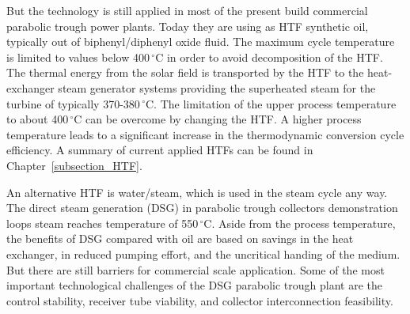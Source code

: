 But the technology is still applied in most of the present build commercial parabolic trough power plants. Today they are using as HTF synthetic oil, typically out of biphenyl/diphenyl oxide fluid. The maximum cycle temperature is limited to values below 400$\,^{\circ}\mathrm{C}$ in order to avoid decomposition of the HTF. The thermal energy from the solar field is transported by the HTF to the heat-exchanger steam generator systems providing the superheated steam for the turbine of typically 370-380$\,^{\circ}\mathrm{C}$. The limitation of the upper process temperature to about 400$\,^{\circ}\mathrm{C}$ can be overcome by changing the HTF. A higher process temperature leads to a significant increase in the thermodynamic conversion cycle efficiency. A summary of current applied HTFs can be found in Chapter~\ref{subsection_HTF}.

An alternative HTF is water/steam, which is used in the steam cycle any way. The direct steam generation (DSG) in parabolic trough collectors demonstration loops steam reaches temperature of 550$\,^{\circ}\mathrm{C}$. Aside from the process temperature, the benefits of DSG compared with oil are based on savings in the heat exchanger, in reduced pumping effort, and the uncritical handing of the medium. But there are still barriers for commercial scale application. Some of the most important technological challenges of the DSG parabolic trough plant are the control stability, receiver tube viability, and collector interconnection feasibility.  \cite{Alguacil2014}


